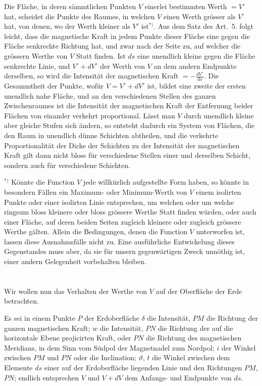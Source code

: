 \documentclass[fontsize=11pt,paper=a4,twoside,openany]{scrbook}
\begin{document}
Die Fläche, in deren sämmtlichen Punkten $V$ einerlei bestimmten Werth $=V^{\circ}$ hat, scheidet die Punkte des Raumes, in welchen $V$ einen Werth grösser als $V^{\circ}$ hat, von denen, wo der Werth kleiner als $V'$ ist$^{*)}$. Aus dem Satz des Art.~5. folgt leicht, dass die magnetische Kraft in jedem Punkte dieser Fläche eine gegen die Fläche senkrechte Richtung hat, und zwar nach der Seite zu, auf welcher die grössern Werthe von $V$ Statt finden. Ist $ds$ eine unendlich kleine gegen die Fläche senkrechte Linie, und $V^{\circ}+dV^{\circ}$ der Werth von $V$ an dem andern Endpunkte derselben, so wird die Intensität der magnetischen Kraft $=-\frac{dV^{\circ}}{ds}$. Die Gesammtheit der Punkte, wofür $V=V^{\circ}+dV^{\circ}$ ist, bildet eine zweite der ersten unendlich nahe Fläche, und an den verschiedenen Stellen des ganzen Zwischenraumes ist die Intensität der magnetischen Kraft der Entfernung beider Flächen von einander verkehrt proportional. Lässt man $V$ durch unendlich kleine aber gleiche Stufen sich ändern, so entsteht dadurch ein System von Flächen, die den Raum in unendlich dünne Schichten abtheilen, und die verkehrte Proportionalität der Dicke der Schichten zu der Intensität der magnetischen Kraft gilt dann nicht bloss für verschiedene Stellen einer und derselben Schicht, sondern auch für verschiedene Schichten.

$^{*)}$ Könnte die Function $V$ jede willkürlich aufgestellte Form haben, so könnte in besondern Fällen ein Maximum- oder Minimum-Werth von $V$ einem isolirten Punkte oder einer isolirten Linie entsprechen, um welchen oder um welche ringsum bloss kleinere oder bloss grössere Werthe Statt finden würden, oder auch einer Fläche, auf deren beiden Seiten zugleich kleinere oder zugleich grössere Werthe gälten. Allein die Bedingungen, denen die Function $V$ unterworfen ist, lassen diese Ausnahmsfälle nicht zu. Eine ausführliche Entwickelung dieses Gegenstandes muss aber, da sie für unsern gegenwärtigen Zweck unnöthig ist, einer andern Gelegenheit vorbehalten bleiben.

\section{}

Wir wollen nun das Verhalten der Werthe von $V$ auf der Oberfläche der Erde betrachten.

Es sei in einem Punkte $P$ der Erdoberfläche $\delta$ die Intensität, $PM$ die Richtung der ganzen magnetischen Kraft; $w$ die Intensität, $PN$ die Richtung der auf die horizontale Ebene projicirten Kraft, oder $PN$ die Richtung des magnetischen Meridians, in dem Sinn vom Südpol der Magnetnadel zum Nordpol; $i$ der Winkel zwischen $PM$ und $PN$ oder die Inclination; $\vartheta$, $t$ die Winkel zwischen dem Elemente $ds$ einer auf der Erdoberfläche liegenden Linie und den Richtungen $PM$, $PN$; endlich entsprechen $V$ und $V+dV$ dem Anfangs- und Endpunkte von $ds$.
\end{document}
